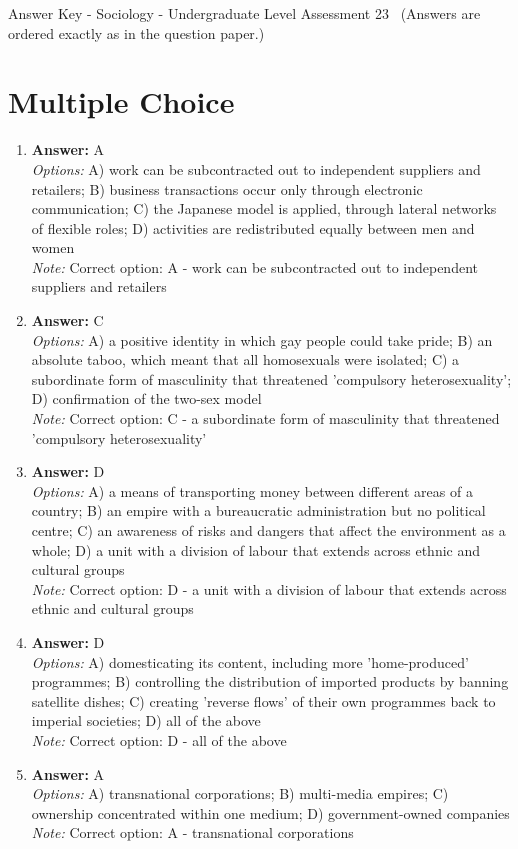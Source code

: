 \documentclass[12pt]{article}
\begin{document}
\begin{center}
Answer Key - Sociology - Undergraduate Level Assessment 23 \
\small (Answers are ordered exactly as in the question paper.)
\end{center}

\section*{Multiple Choice}
\begin{enumerate}[label=\arabic*.]
\item \textbf{Answer:} A
\\ \textit{Options:} A) work can be subcontracted out to independent suppliers and retailers; B) business transactions occur only through electronic communication; C) the Japanese model is applied, through lateral networks of flexible roles; D) activities are redistributed equally between men and women
\\ \textit{Note:} Correct option: A - work can be subcontracted out to independent suppliers and retailers
\item \textbf{Answer:} C
\\ \textit{Options:} A) a positive identity in which gay people could take pride; B) an absolute taboo, which meant that all homosexuals were isolated; C) a subordinate form of masculinity that threatened 'compulsory heterosexuality'; D) confirmation of the two-sex model
\\ \textit{Note:} Correct option: C - a subordinate form of masculinity that threatened 'compulsory heterosexuality'
\item \textbf{Answer:} D
\\ \textit{Options:} A) a means of transporting money between different areas of a country; B) an empire with a bureaucratic administration but no political centre; C) an awareness of risks and dangers that affect the environment as a whole; D) a unit with a division of labour that extends across ethnic and cultural groups
\\ \textit{Note:} Correct option: D - a unit with a division of labour that extends across ethnic and cultural groups
\item \textbf{Answer:} D
\\ \textit{Options:} A) domesticating its content, including more 'home-produced' programmes; B) controlling the distribution of imported products by banning satellite dishes; C) creating 'reverse flows' of their own programmes back to imperial societies; D) all of the above
\\ \textit{Note:} Correct option: D - all of the above
\item \textbf{Answer:} A
\\ \textit{Options:} A) transnational corporations; B) multi-media empires; C) ownership concentrated within one medium; D) government-owned companies
\\ \textit{Note:} Correct option: A - transnational corporations
\end{enumerate}
\end{document}

